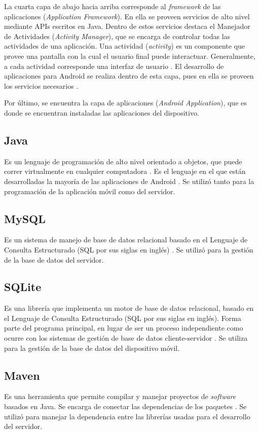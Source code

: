 La cuarta capa de abajo hacia arriba corresponde al \textit{framework} de las aplicaciones (\textit{Application Framework}). En ella se proveen servicios de alto nivel mediante APIs escritos en Java. Dentro de estos servicios destaca el Manejador de Actividades (\textit{Activity Manager}), que se encarga de controlar todas las actividades de una aplicación\cite{AND3}. Una actividad (\textit{activity}) es un componente que provee una pantalla con la cual el usuario final puede interactuar. Generalmente, a cada actividad corresponde una interfaz de usuario \cite{AND6}. El desarrollo de aplicaciones para Android se realiza dentro de esta capa, pues en ella se proveen los servicios necesarios \cite{AND5}.

Por último, se encuentra la capa de aplicaciones (\textit{Android Application}), que es donde se encuentran instaladas las aplicaciones del dispositivo\cite{AND3}.

\subsection{Java}
Es un lenguaje de programación de alto nivel orientado a objetos, que puede correr virtualmente en cualquier computadora \cite{JAV1}. Es el lenguaje en el que están desarrolladas la mayoría de las aplicaciones de Android \cite{AND2}. Se utilizó tanto para la programación de la aplicación móvil como del servidor.

\subsection{MySQL} 
Es un sistema de manejo de base de datos relacional basado en el Lenguaje de Consulta Estructurado (SQL por sus siglas en inglés) \cite{SQL1}. Se utilizó para la gestión de la base de datos del servidor.

\subsection{SQLite}
Es una librería que implementa un motor de base de datos relacional, basado en el Lenguaje de Consulta Estructurado (SQL por sus siglas en inglés). Forma parte del programa principal, en lugar de ser un proceso independiente como ocurre con los sistemas de gestión de base de datos cliente-servidor \cite{SQL2}. Se utiliza para la gestión de la base de datos del dispositivo móvil.

\subsection{Maven}
Es una herramienta que permite compilar y  manejar proyectos de \textit{software} basados en Java. Se encarga de conectar las dependencias de los paquetes \cite{MVN1}. Se utilizó para manejar la dependencia entre las librerías usadas para el desarrollo del servidor.

